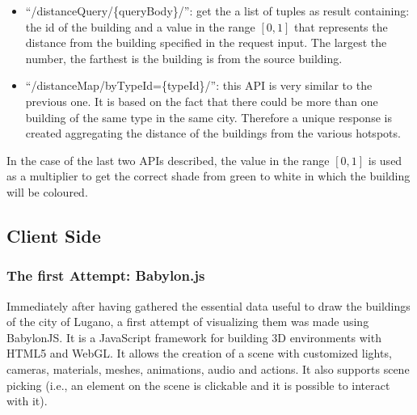 \begin{itemize}
	\item ``/distanceQuery/\{queryBody\}/'': get the a list of tuples as result containing: the id of the building and a value in the range $[0,1]$ that represents the distance from the building specified in the request input. The largest the number, the farthest is the building is from the source building.
	\item ``/distanceMap/byTypeId=\{typeId\}/'': this API is very similar to the previous one. It is based on the fact that there could be more than one building of the same type in the same city. Therefore a unique response is created aggregating the distance of the buildings from the various hotspots.
\end{itemize}
In the case of the last two APIs described, the value in the range $[0,1]$ is used as a multiplier to get the correct shade from green to white in which the building will be coloured.
\subsection{Client Side}
\subsubsection{The first Attempt: Babylon.js}
Immediately after having gathered the essential data useful to draw the buildings of the city of Lugano, a first attempt of visualizing them was made using BabylonJS. It is a JavaScript framework for building 3D environments with HTML5 and WebGL. It allows the creation of a scene with customized lights, cameras, materials, meshes, animations, audio and actions. It also supports scene picking (i.e., an element on the scene is clickable and it is possible to interact with it).\\

